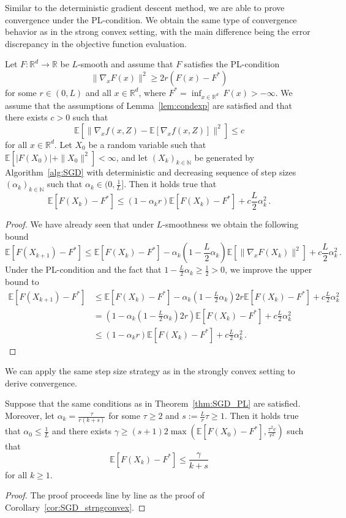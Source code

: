 \documentclass[12pt,openany]{book}
\theoremstyle{definition}
\theoremstyle{definition}
\newcommand{\E}{\mathbb{E}}
\newcommand{\N}{\mathbb{N}}
\newcommand{\R}{\mathbb{R}}
\begin{document}
Similar to the deterministic gradient descent method, we are able to prove convergence under the PL-condition. We obtain the same type of convergence behavior as in the strong convex setting, with the main difference being the error discrepancy in the objective function evaluation.

\begin{thm}\label{thm:SGD_PL}
Let $F:\R^d\to\R$ be $L$-smooth and assume that $F$ satisfies the PL-condition
\[\|\nabla_x F(x)\|^2 \ge 2r(F(x)-F^\ast)\]
for some $r\in(0,L)$ and all $x\in\R^d$, where $F^\ast = \inf_{x\in\R^d}\ F(x) >-\infty$. We assume that the assumptions of Lemma~\ref{lem:condexp} are satisfied and that there exists $c>0$ such that
\[\E[\|\nabla_x f(x,Z)- \E[\nabla_x f(x,Z)] \|^2]\le c \]
for all $x\in\R^d$. Let $X_0$ be a random variable such that $\E[|F(X_0)|+\|X_0\|^2]<\infty$, and let $(X_k)_{k\in\N}$ be generated by Algorithm~\ref{alg:SGD} with deterministic and decreasing sequence of step sizes $(\alpha_k)_{k\in\N}$ such that $\alpha_k\in(0,\frac1L]$. Then it holds true that
\[\E[F(X_k)-F^\ast] \le (1-\alpha_k r)\E[F(X_k)-F^\ast] + c\frac{L}2 \alpha_k^2\,. \]
\end{thm}

\begin{proof}
We have already seen that under $L$-smoothness we obtain the following bound
\[\E[F(X_{k+1}) - F^\ast] \le \E[F(X_k)-F^\ast] -\alpha_k(1-\frac{L}2\alpha_k) \E[\|\nabla_x F(X_k)\|^2] + c\frac{L}2\alpha_k^2\, . \]
Under the PL-condition and the fact that $1-\frac{L}2\alpha_k\ge \frac12>0$, we improve the upper bound to
\begin{align*}
\E[F(X_{k+1}) - F^\ast] &\le\E[F(X_k)-F^\ast] -\alpha_k(1-\frac{L}2\alpha_k) 2r \E[F(X_k)-F^\ast]+ c\frac{L}2\alpha_k^2\\
&=(1-\alpha_k(1-\frac{L}2\alpha_k)2r)\E[F(X_k)-F^\ast] + c\frac{L}2\alpha_k^2\\
&\le (1-\alpha_k r)\E[F(X_k)-F^\ast] + c\frac{L}2\alpha_k^2\, .
\end{align*}
\end{proof}

We can apply the same step size strategy as in the strongly convex setting to derive convergence.
\begin{cor}
Suppose that the same conditions as in Theorem~\ref{thm:SGD_PL} are satisfied. Moreover, let $\alpha_k = \frac{\tau}{r(k+s)}$ for some $\tau\ge 2$ and $s := \frac{L}{r}\tau\ge1$. Then it holds true that $\alpha_0\le \frac{1}{L}$ and there exists $\gamma\ge (s+1)2\max(\E[F(X_0)-F^\ast], \frac{\tau^2c}{r^2})$ such that
\[\E[F(X_k)-F^\ast] \le \frac{\gamma}{k+s}\]
for all $k\ge1$.
\end{cor}
\begin{proof}
The proof proceeds line by line as the proof of Corollary~\ref{cor:SGD_strngconvex}.
\end{proof}
\end{document}
